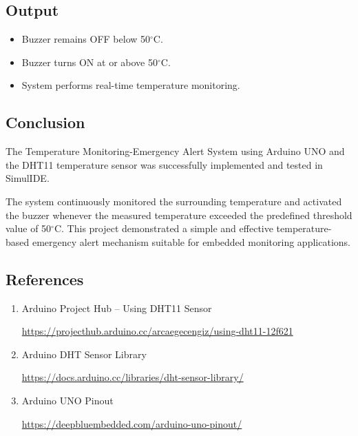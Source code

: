 
\subsection{Output}

\begin{itemize}

\item Buzzer remains OFF below 50$^\circ$C.

\item Buzzer turns ON at or above 50$^\circ$C.

\item System performs real-time temperature monitoring.

\end{itemize}


\subsection{Conclusion}

The Temperature Monitoring-Emergency Alert System using Arduino UNO and the DHT11 temperature sensor was successfully implemented and tested in SimulIDE.

The system continuously monitored the surrounding temperature and activated the buzzer whenever the measured temperature exceeded the predefined threshold value of 50$^\circ$C. This project demonstrated a simple and effective temperature-based emergency alert mechanism suitable for embedded monitoring applications.


\subsection{References}

\begin{enumerate}

\item Arduino Project Hub – Using DHT11 Sensor

\url{https://projecthub.arduino.cc/arcaegecengiz/using-dht11-12f621}

\item Arduino DHT Sensor Library

\url{https://docs.arduino.cc/libraries/dht-sensor-library/}

\item Arduino UNO Pinout

\url{https://deepbluembedded.com/arduino-uno-pinout/}

\end{enumerate}


